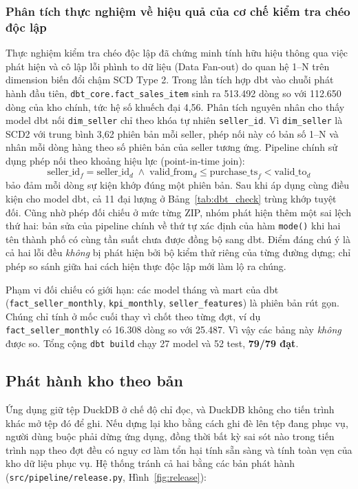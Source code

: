 \subsubsection*{Phân tích thực nghiệm về hiệu quả của cơ chế kiểm tra chéo độc lập}
Thực nghiệm kiểm tra chéo độc lập đã chứng minh tính hữu hiệu thông qua việc phát hiện và cô lập lỗi phình to dữ liệu (Data Fan-out) do quan hệ 1--N trên dimension biến đổi chậm SCD Type 2. Trong lần tích hợp dbt vào chuỗi phát hành đầu tiên, \texttt{dbt\_core.fact\_sales\_item} sinh ra 513.492 dòng so với 112.650 dòng của kho chính, tức hệ số khuếch đại 4,56. Phân tích nguyên nhân cho thấy model dbt nối \texttt{dim\_seller} chỉ theo khóa tự nhiên \texttt{seller\_id}. Vì \texttt{dim\_seller} là SCD2 với trung bình 3,62 phiên bản mỗi seller, phép nối này có bản số 1--N và nhân mỗi dòng hàng theo số phiên bản của seller tương ứng. Pipeline chính sử dụng phép nối theo khoảng hiệu lực (point-in-time join):
\begin{equation}
\text{seller\_id}_f = \text{seller\_id}_d \;\land\; \text{valid\_from}_d \le \text{purchase\_ts}_f < \text{valid\_to}_d
\end{equation}
bảo đảm mỗi dòng sự kiện khớp đúng một phiên bản. Sau khi áp dụng cùng điều kiện cho model dbt, cả 11 đại lượng ở Bảng~\ref{tab:dbt_check} trùng khớp tuyệt đối. Cũng nhờ phép đối chiếu ở mức từng ZIP, nhóm phát hiện thêm một sai lệch thứ hai: bản sửa của pipeline chính về thứ tự xác định của hàm \texttt{mode()} khi hai tên thành phố có cùng tần suất chưa được đồng bộ sang dbt. Điểm đáng chú ý là cả hai lỗi đều \emph{không} bị phát hiện bởi bộ kiểm thử riêng của từng đường dựng; chỉ phép so sánh giữa hai cách hiện thực độc lập mới làm lộ ra chúng.

Phạm vi đối chiếu có giới hạn: các model tháng và mart của dbt (\texttt{fact\_seller\_monthly}, \texttt{kpi\_monthly}, \texttt{seller\_features}) là phiên bản rút gọn. Chúng chỉ tính ở mốc cuối thay vì chốt theo từng đợt, ví dụ \texttt{fact\_seller\_monthly} có 16.308 dòng so với 25.487. Vì vậy các bảng này \emph{không} được so. Tổng cộng \texttt{dbt build} chạy 27 model và 52 test, \textbf{79/79 đạt}.

\subsection{Phát hành kho theo bản}
\label{sec:release}
Ứng dụng giữ tệp DuckDB ở chế độ chỉ đọc, và DuckDB không cho tiến trình khác mở tệp đó để ghi. Nếu dựng lại kho bằng cách ghi đè lên tệp đang phục vụ, người dùng buộc phải dừng ứng dụng, đồng thời bất kỳ sai sót nào trong tiến trình nạp theo đợt đều có nguy cơ làm tổn hại tính sẵn sàng và tính toàn vẹn của kho dữ liệu phục vụ. Hệ thống tránh cả hai bằng các bản phát hành (\texttt{src/pipeline/release.py}, Hình~\ref{fig:release}):

